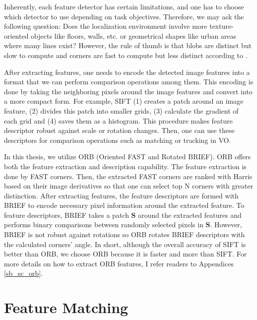 \documentclass[a4paper]{report}
\numberwithin{figure}{section}
\begin{document}
Inherently, each feature detector has certain limitations, and one has to 
choose which detector to use depending on task objectives. Therefore, we may 
ask the following question: Does the localization environment involve more 
texture-oriented objects like floors, walls, etc. or geometrical shapes like 
urban areas where many lines exist?  However, the rule of thumb is that blobs 
are distinct but slow to compute and corners are fast to compute but less 
distinct according to \parencite{Fraundorfer2012}. 

After extracting features, one needs to encode the detected image features 
into a format that we can perform comparison operations among them. 
This encoding is done by taking the neighboring pixels around the image 
features and 
convert into a more compact form. For example, SIFT (1) creates a patch around 
an 
image feature, (2) divides this patch into 
smaller grids, (3) calculate the gradient of each grid and (4) saves them as a 
histogram.  This procedure makes feature descriptor robust against scale or 
rotation changes. Then, one can use these descriptors for comparison 
operations such as matching or tracking in VO. 

In this thesis, we utilize ORB (Oriented FAST and Rotated BRIEF). ORB offers 
both the feature extraction and description capability. The feature 
extraction is done by FAST corners. Then, the extracted FAST corners are 
ranked with Harris based on their image derivatives so that one can select 
top N corners with greater distinction. After extracting features, the 
feature descriptors are formed with BRIEF to encode necessary pixel 
information around the extracted feature. To feature descriptors, BRIEF takes 
a patch $\mathbf{S}$ around the extracted features and performs binary 
comparisons between randomly selected pixels in $\mathbf{S}$. 
However, BRIEF is not robust against rotations so ORB rotates BRIEF 
descriptors with the calculated corners' angle. In short, although the overall 
accuracy 
of SIFT is better than ORB, we choose ORB because it is faster and more than 
SIFT. For more details on how to extract ORB features, I refer readers to 
Appendices \ref{sb_sc_orb}.


\section{Feature Matching} \label{sc_feature_matching}
\end{document}
